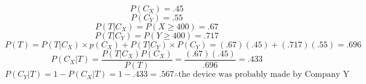 \documentclass[8pt]{extarticle}
\begin{document}
{\begin{minipage}{\linewidth}
\begin{equation}
            P(C_X) = .45
        \end{equation}
        \begin{equation}
            P(C_Y) = .55
        \end{equation}
        \begin{equation}
            P(T|C_X) = P(X \geq 400) = .67
        \end{equation}
        \begin{equation}
            P(T|C_Y) = P(Y \geq 400) = .717
        \end{equation}
        \begin{equation}
            P(T) = P(T|C_X) \times p(C_X) + P(T|C_Y) \times P(C_Y) = (.67)(.45) + (.717)(.55) = .696
        \end{equation}
        \begin{equation}
            P(C_X|T) = \frac{P(T|C_X)P(C_X)}{P(T)} = \frac{(.67)(.45)}{.696} = .433
        \end{equation}
        \begin{equation}
            P(C_Y|T) = 1 - P(C_X|T) = 1 - .433 = .567 \therefore \text{the device was probably made by Company Y}
        \end{equation}
    \end{minipage}
}
\end{document}
